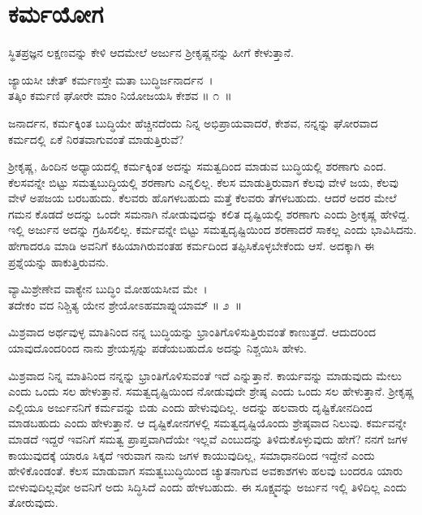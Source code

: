 
\chapter{ಕರ್ಮಯೋಗ}

ಸ್ಥಿತಪ್ರಜ್ಞನ ಲಕ್ಷಣವನ್ನು ಕೇಳಿ ಆದಮೇಲೆ ಅರ್ಜುನ ಶ‍್ರೀಕೃಷ್ಣನನ್ನು ಹೀಗೆ ಕೇಳುತ್ತಾನೆ.

\begin{shloka}
ಜ್ಯಾಯಸೀ ಚೇತ್ ಕರ್ಮಣಸ್ತೇ ಮತಾ ಬುದ್ಧಿರ್ಜನಾರ್ದನ~।\\ತತ್ಕಿಂ ಕರ್ಮಣಿ ಘೋರೇ ಮಾಂ ನಿಯೋಜಯಸಿ ಕೇಶವ \hfill॥ ೧~॥
\end{shloka}

\begin{artha}
ಜನಾರ್ದನ, ಕರ್ಮಕ್ಕಿಂತ ಬುದ್ಧಿಯೇ ಹೆಚ್ಚಿನದೆಂದು ನಿನ್ನ ಅಭಿಪ್ರಾಯವಾದರೆ, ಕೇಶವ, ನನ್ನನ್ನು ಘೋರವಾದ ಕರ್ಮದಲ್ಲಿ ಏಕೆ ನಿರತವಾಗುವಂತೆ ಮಾಡುತ್ತಿರುವೆ?
\end{artha}

ಶ‍್ರೀಕೃಷ್ಣ, ಹಿಂದಿನ ಅಧ್ಯಾಯದಲ್ಲಿ ಕರ್ಮಕ್ಕಿಂತ ಅದನ್ನು ಸಮತ್ವದಿಂದ ಮಾಡುವ ಬುದ್ಧಿಯಲ್ಲಿ ಶರಣಾಗು ಎಂದ. ಕೆಲಸವನ್ನೇ ಬಿಟ್ಟು ಸಮತ್ವಬುದ್ಧಿಯಲ್ಲಿ ಶರಣಾಗು ಎನ್ನಲಿಲ್ಲ. ಕೆಲಸ ಮಾಡುತ್ತಿರುವಾಗ ಕೆಲವು ವೇಳೆ ಜಯ, ಕೆಲವು ವೇಳೆ ಅಪಜಯ ಬರಬಹುದು. ಕೆಲವರು ಹೊಗಳಬಹುದು ಮತ್ತೆ ಕೆಲವರು ತೆಗಳಬಹುದು. ಆದರೆ ಅದರ ಮೇಲೆ ಗಮನ ಕೊಡದೆ ಅದನ್ನು ಒಂದೇ ಸಮನಾಗಿ ನೋಡುವುದನ್ನು ಕಲಿತ ದೃಷ್ಟಿಯಲ್ಲಿ ಶರಣಾಗು ಎಂದು ಶ‍್ರೀಕೃಷ್ಣ ಹೇಳಿದ್ದ. ಇಲ್ಲಿ ಅರ್ಜುನ ಅದನ್ನು ಗ್ರಹಿಸಲಿಲ್ಲ. ಕರ್ಮವನ್ನೇ ಬಿಟ್ಟು ಸಮತ್ವದೃಷ್ಟಿಯಿಂದ ಶರಣಾದರೆ ಸಾಕಲ್ಲ ಎಂದು ಭಾವಿಸಿದನು. ಹೇಗಾದರೂ ಮಾಡಿ ಅವನಿಗೆ ಕಹಿಯಾಗಿರುವಂತಹ ಕರ್ಮದಿಂದ ತಪ್ಪಿಸಿಕೊಳ್ಳಬೇಕೆಂದು ಆಸೆ. ಅದಕ್ಕಾಗಿ ಈ ಪ್ರಶ್ನೆಯನ್ನು ಹಾಕುತ್ತಿರುವನು.

\begin{shloka}
ವ್ಯಾಮಿಶ್ರೇಣೇವ ವಾಕ್ಯೇನ ಬುದ್ಧಿಂ ಮೋಹಯಸೀವ ಮೇ~।\\ತದೇಕಂ ವದ ನಿಶ್ಚಿತ್ಯ ಯೇನ ಶ್ರೇಯೋಽಹಮಾಪ್ನುಯಾಮ್ \hfill॥ ೨~॥
\end{shloka}

\begin{artha}
ಮಿಶ್ರವಾದ ಅರ್ಥವುಳ್ಳ ಮಾತಿನಿಂದ ನನ್ನ ಬುದ್ಧಿಯನ್ನು ಭ್ರಾಂತಿಗೊಳಿಸುತ್ತಿರುವಂತೆ ಕಾಣುತ್ತದೆ. ಆದುದರಿಂದ ಯಾವುದೊಂದರಿಂದ ನಾನು ಶ್ರೇಯಸ್ಸನ್ನು ಪಡೆಯಬಹುದೊ ಅದನ್ನು ನಿಶ್ಚಯಿಸಿ ಹೇಳು.
\end{artha}

ಮಿಶ್ರವಾದ ನಿನ್ನ ಮಾತಿನಿಂದ ನನ್ನನ್ನು ಭ್ರಾಂತಿಗೊಳಿಸುವಂತೆ ಇದೆ ಎನ್ನುತ್ತಾನೆ. ಕಾರ್ಯವನ್ನು ಮಾಡುವುದು ಮೇಲು ಎಂದು ಒಂದು ಸಲ ಹೇಳುತ್ತಾನೆ. ಸಮತ್ವದೃಷ್ಟಿಯಿಂದ ನೋಡು\-ವುದೇ ಶ್ರೇಷ್ಠ ಎಂದು ಒಂದು ಸಲ ಹೇಳುತ್ತಾನೆ. ಶ‍್ರೀಕೃಷ್ಣ ಎಲ್ಲಿಯೂ ಅರ್ಜುನನಿಗೆ ಕರ್ಮವನ್ನು ಬಿಡು ಎಂದು ಹೇಳುವುದಿಲ್ಲ. ಅದನ್ನು ಹಲವಾರು ದೃಷ್ಟಿಕೋನದಿಂದ ಮಾಡಬಹುದು ಎಂದು ಹೇಳುತ್ತಾನೆ. ಆ ದೃಷ್ಟಿಕೋನಗಳಲ್ಲಿ ಸಮತ್ವದೃಷ್ಟಿಯೊಂದು ಶ್ರೇಷ್ಠವಾದ ನಿಲುವು. ಕರ್ಮವನ್ನೇ ಮಾಡದೆ ಇದ್ದರೆ ಇವನಿಗೆ ಸಮತ್ವ ಪ್ರಾಪ್ತವಾಗಿದೆಯೇ ಇಲ್ಲವೆ ಎಂಬುದನ್ನು ತಿಳಿದುಕೊಳ್ಳುವುದು ಹೇಗೆ? ನನಗೆ ಜಗಳ ಕಾಯುವುದಕ್ಕೆ ಯಾರೂ ಸಿಕ್ಕದೆ ಇರುವಾಗ ನಾನು ಜಗಳ ಕಾಯುವುದಿಲ್ಲ, ಸಮಾಧಾನದಿಂದ ಇದ್ದೇನೆ ಎಂದು ಹೇಳಿಕೊಂಡಂತೆ. ಕೆಲಸ ಮಾಡುವಾಗ ಸಮತ್ವಬುದ್ಧಿಯಿಂದ ಚ್ಯುತನಾಗುವ ಅವಕಾಶಗಳು ಹಲವು ಬಂದರೂ ಯಾರು ಬೀಳುವುದಿಲ್ಲವೋ ಅವನಿಗೆ ಅದು ಸಿದ್ಧಿಸಿದೆ ಎಂದು ಹೇಳಬಹುದು. ಈ ಸೂಕ್ಷ್ಮವನ್ನು ಅರ್ಜುನ ಇಲ್ಲಿ ತಿಳಿದಿಲ್ಲ ಎಂದು ತೋರುವುದು.

